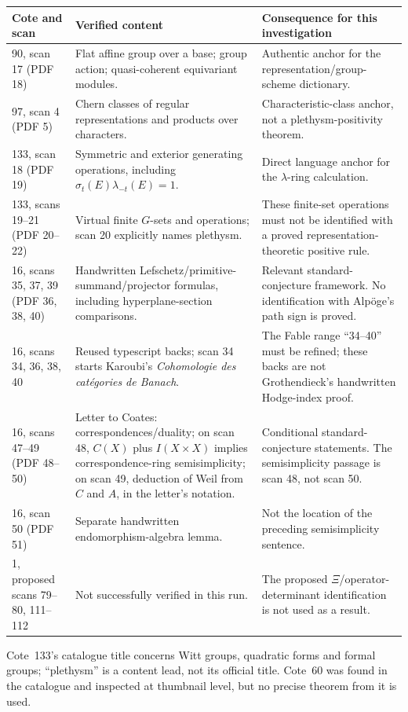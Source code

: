 \documentclass[11pt,a4paper]{article}
\theoremstyle{named}\newtheorem{finding}{Finding}[section]
\theoremstyle{definition}\newtheorem{definition}[finding]{Definition}
\theoremstyle{remark}\newtheorem{remark}[finding]{Remark}
\begin{document}
{\small\begin{longtable}{p{.19\linewidth}p{.36\linewidth}p{.37\linewidth}}
\toprule Cote and scan&Verified content&Consequence for this investigation\\\midrule\endhead
90, scan 17 (PDF 18)&Flat affine group over a base; group action; quasi-coherent equivariant modules.&Authentic anchor for the representation/group-scheme dictionary.\\
97, scan 4 (PDF 5)&Chern classes of regular representations and products over characters.&Characteristic-class anchor, not a plethysm-positivity theorem.\\
133, scan 18 (PDF 19)&Symmetric and exterior generating operations, including $\sigma_t(E)\lambda_{-t}(E)=1$.&Direct language anchor for the $\lambda$-ring calculation.\\
133, scans 19--21 (PDF 20--22)&Virtual finite $G$-sets and operations; scan 20 explicitly names plethysm.&These finite-set operations must not be identified with a proved representation-theoretic positive rule.\\
16, scans 35, 37, 39 (PDF 36, 38, 40)&Handwritten Lefschetz/primitive-summand/projector formulas, including hyperplane-section comparisons.&Relevant standard-conjecture framework. No identification with Alp\"oge's path sign is proved.\\
16, scans 34, 36, 38, 40&Reused typescript backs; scan 34 starts Karoubi's \emph{Cohomologie des cat\'egories de Banach}.&The Fable range ``34--40'' must be refined; these backs are not Grothendieck's handwritten Hodge-index proof.\\
16, scans 47--49 (PDF 48--50)&Letter to Coates: correspondences/duality; on scan 48, $C(X)$ plus $I(X\times X)$ implies correspondence-ring semisimplicity; on scan 49, deduction of Weil from $C$ and $A$, in the letter's notation.&Conditional standard-conjecture statements. The semisimplicity passage is scan 48, not scan 50.\\
16, scan 50 (PDF 51)&Separate handwritten endomorphism-algebra lemma.&Not the location of the preceding semisimplicity sentence.\\
1, proposed scans 79--80, 111--112&Not successfully verified in this run.&The proposed $\Xi$/operator-determinant identification is not used as a result.\\\bottomrule
\end{longtable}}
Cote~133's catalogue title concerns Witt groups, quadratic forms and formal groups; ``plethysm'' is a content lead, not its official title. Cote~60 was found in the catalogue and inspected at thumbnail level, but no precise theorem from it is used.
\end{document}
